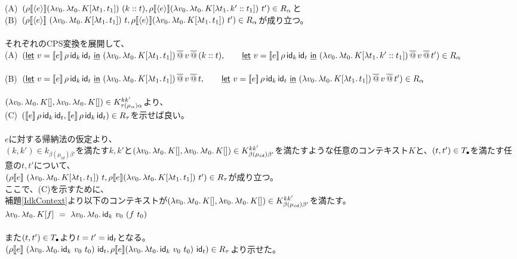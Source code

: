   (A)\ $(\rho \CPSTh{\Prompt{e}} \LamP{v_0}{\Lam{t_0}{K[\Lam{t_1}{t_1}]}}\ (\Cons{k}{t}), \rho \CPSTh{\Prompt{e}} \LamP{v_0}{\Lam{t_0}{K[\Lam{t_1}{\Cons{k'}{t_1}}]}}\ t')\in R_{\alpha}$と\\
(B)\ $(\rho \CPSTh{\Prompt{e}}\ \LamP{v_0}{\Lam{t_0}{K[\Lam{t_1}{t_1}]}}\ t, \rho \CPSTh{\Prompt{e}} \LamP{v_0}{\Lam{t_0}{K[\Lam{t_1}{t_1}]}}\ t')\in R_{\alpha}$が成り立つ。\\
\\
それぞれのCPS変換を展開して、\\
(A)\ $(\underline{\textsf{let}}\ v=[\![{e}]\!]\,\rho\,\textsf{id}_k\,\textsf{id}_t\ \underline{\textsf{in}}\ {{(\lambda{v_0}.\,{\lambda{t_0}.\,{K[\lambda{t_1}.\,{t_1}]}})}\,\overline{@}\,{v}}\,\overline{@}\,{(k::t)},\\
\qquad   \underline{\textsf{let}}\ v=[\![{e}]\!]\,\rho\,\textsf{id}_k\,\textsf{id}_t\ \underline{\textsf{in}}\ {{(\lambda{v_0}.\,{\lambda{t_0}.\,{K[\lambda{t_1}.\,{k'::t_1}]}})}\,\overline{@}\,{v}}\,\overline{@}\,{t'})\in R_{\alpha}$ \\
\\
(B)\ $(\underline{\textsf{let}}\ v=[\![{e}]\!]\,\rho\,\textsf{id}_k\,\textsf{id}_t\ \underline{\textsf{in}}\ {{(\lambda{v_0}.\,{\lambda{t_0}.\,{K[\lambda{t_1}.\,{t_1}]}})}\,\overline{@}\,{v}}\,\overline{@}\,{t},\\
\qquad  \underline{\textsf{let}}\ v=[\![{e}]\!]\,\rho\,\textsf{id}_k\,\textsf{id}_t\ \underline{\textsf{in}}\ {{(\lambda{v_0}.\,{\lambda{t_0}.\,{K[\lambda{t_1}.\,{t_1}]}})}\,\overline{@}\,{v}}\,\overline{@}\,{t'})\in R_{\alpha}$ \\
\\
$(\lambda{v_0}.\,{\lambda{t_0}.\,{K[]}}, \lambda{v_0}.\,{\lambda{t_0}.\,{K[]}})\in  K^{kk'}_{\tau(\mu_{\alpha})\alpha}$より、\\
(C)\ $([\![{e}]\!]\,\rho\,\textsf{id}_k\,\textsf{id}_t,[\![{e}]\!]\,\rho\,\textsf{id}_k\,\textsf{id}_t)\in R_{\tau}$を示せば良い。\\
\\
$e$に対する帰納法の仮定より、\\
$(k,k')\in k_{\beta(\mu_{id})\beta'}$を満たす$k,k'$と$(\lambda{v_0}.\,{\lambda{t_0}.\,{K[]}}, \lambda{v_0}.\,{\lambda{t_0}.\,{K[]}})\in  K^{kk'}_{\beta(\mu_{id})\beta'}$を満たすような任意のコンテキスト$K$と、$(t, t') \in T_{\bullet}$を満たす任意の$t, t'$について、\\
$(\rho \CPSTh{e}\ \LamP{v_0}{\Lam{t_0}{K[\Lam{t_1}{t_1}]}}\ t, \rho \CPSTh{e} \LamP{v_0}{\Lam{t_0}{K[\Lam{t_1}{t_1}]}}\ t')\in R_{\tau}$が成り立つ。\\
ここで、(C)を示すために、\\
補題\ref{IdkContext}より以下のコンテキストが$(\lambda{v_0}.\,{\lambda{t_0}.\,{K[]}}, \lambda{v_0}.\,{\lambda{t_0}.\,{K[]}})\in  K^{kk'}_{\beta(\mu_{id})\beta'}$を満たす。\\
$\Lam{v_0}{\Lam{t_0}{K[f]}}\ =\ \Lam{v_0}{\Lam{t_0}{\Idk\ v_0\ (f\ t_0)}}$\\
\\
また$(t, t') \in T_{\bullet}$より$t=t'=\textsf{id}_t$となる。\\
$(\rho \CPSTh{e}\ \LamP{v_0}{\Lam{t_0}{\Idk\ v_0\ t_0}}\ \Idt, \rho \CPSTh{e} \LamP{v_0}{\Lam{t_0}{\Idk\ v_0\ t_0}}\ \Idt)\in R_{\tau}$より示せた。
